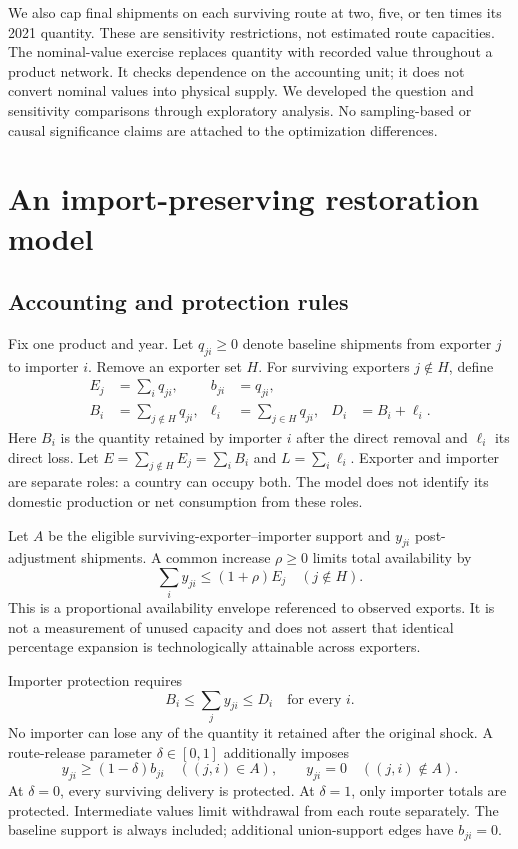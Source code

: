 \documentclass[11pt,a4paper]{article}
\begin{document}
We also cap final shipments on each surviving route at two, five, or ten times its 2021 quantity. These are sensitivity restrictions, not estimated route capacities. The nominal-value exercise replaces quantity with recorded value throughout a product network. It checks dependence on the accounting unit; it does not convert nominal values into physical supply. We developed the question and sensitivity comparisons through exploratory analysis. No sampling-based or causal significance claims are attached to the optimization differences.

\section{An import-preserving restoration model}
\subsection{Accounting and protection rules}
Fix one product and year. Let $q_{ji}\geq0$ denote baseline shipments from exporter $j$ to importer $i$. Remove an exporter set $H$. For surviving exporters $j\notin H$, define
\begin{align}
 E_j&=\sum_i q_{ji}, & b_{ji}&=q_{ji},\\
 B_i&=\sum_{j\notin H}q_{ji}, & \ell_i&=\sum_{j\in H}q_{ji}, & D_i&=B_i+\ell_i.
\end{align}
Here $B_i$ is the quantity retained by importer $i$ after the direct removal and $\ell_i$ its direct loss. Let $E=\sum_{j\notin H}E_j=\sum_i B_i$ and $L=\sum_i\ell_i$. Exporter and importer are separate roles: a country can occupy both. The model does not identify its domestic production or net consumption from these roles.

Let $A$ be the eligible surviving-exporter--importer support and $y_{ji}$ post-adjustment shipments. A common increase $\rho\geq0$ limits total availability by
\begin{equation}\sum_i y_{ji}\leq(1+\rho)E_j\quad(j\notin H).\label{eq:availability}\end{equation}
This is a proportional availability envelope referenced to observed exports. It is not a measurement of unused capacity and does not assert that identical percentage expansion is technologically attainable across exporters.

Importer protection requires
\begin{equation}B_i\leq\sum_j y_{ji}\leq D_i\quad\text{for every }i.\label{eq:floor}\end{equation}
No importer can lose any of the quantity it retained after the original shock. A route-release parameter $\delta\in[0,1]$ additionally imposes
\begin{equation}y_{ji}\geq(1-\delta)b_{ji}\quad((j,i)\in A),\qquad y_{ji}=0\quad((j,i)\notin A).\label{eq:release}\end{equation}
At $\delta=0$, every surviving delivery is protected. At $\delta=1$, only importer totals are protected. Intermediate values limit withdrawal from each route separately. The baseline support is always included; additional union-support edges have $b_{ji}=0$.
\end{document}
